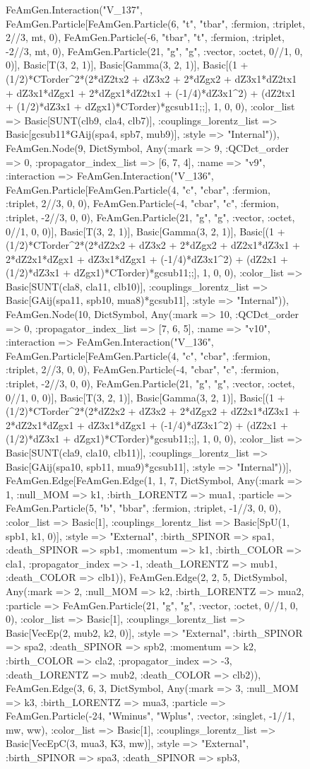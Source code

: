 \documentclass{revtex4}
\begin{document}
\begin{figure}[!htb]
\begin{center}
{FeAmGen.Interaction("V_137", FeAmGen.Particle[FeAmGen.Particle(6, "t", "tbar", :fermion, :triplet, 2//3, mt, 0), FeAmGen.Particle(-6, "tbar", "t", :fermion, :triplet, -2//3, mt, 0), FeAmGen.Particle(21, "g", "g", :vector, :octet, 0//1, 0, 0)], Basic[T(3, 2, 1)], Basic[Gamma(3, 2, 1)], Basic[(1 + (1/2)*CTorder^2*(2*dZ2tx2 + dZ3x2 + 2*dZgx2 + dZ3x1*dZ2tx1 + dZ3x1*dZgx1 + 2*dZgx1*dZ2tx1 + (-1/4)*dZ3x1^2) + (dZ2tx1 + (1/2)*dZ3x1 + dZgx1)*CTorder)*gcsub11;;], 1, 0, 0), :color_list => Basic[SUNT(clb9, cla4, clb7)], :couplings_lorentz_list => Basic[gcsub11*GAij(spa4, spb7, mub9)], :style => "Internal")), FeAmGen.Node(9, Dict{Symbol, Any}(:mark => 9, :QCDct_order => 0, :propagator_index_list => [6, 7, 4], :name => "v9", :interaction => FeAmGen.Interaction("V_136", FeAmGen.Particle[FeAmGen.Particle(4, "c", "cbar", :fermion, :triplet, 2//3, 0, 0), FeAmGen.Particle(-4, "cbar", "c", :fermion, :triplet, -2//3, 0, 0), FeAmGen.Particle(21, "g", "g", :vector, :octet, 0//1, 0, 0)], Basic[T(3, 2, 1)], Basic[Gamma(3, 2, 1)], Basic[(1 + (1/2)*CTorder^2*(2*dZ2x2 + dZ3x2 + 2*dZgx2 + dZ2x1*dZ3x1 + 2*dZ2x1*dZgx1 + dZ3x1*dZgx1 + (-1/4)*dZ3x1^2) + (dZ2x1 + (1/2)*dZ3x1 + dZgx1)*CTorder)*gcsub11;;], 1, 0, 0), :color_list => Basic[SUNT(cla8, cla11, clb10)], :couplings_lorentz_list => Basic[GAij(spa11, spb10, mua8)*gcsub11], :style => "Internal")), FeAmGen.Node(10, Dict{Symbol, Any}(:mark => 10, :QCDct_order => 0, :propagator_index_list => [7, 6, 5], :name => "v10", :interaction => FeAmGen.Interaction("V_136", FeAmGen.Particle[FeAmGen.Particle(4, "c", "cbar", :fermion, :triplet, 2//3, 0, 0), FeAmGen.Particle(-4, "cbar", "c", :fermion, :triplet, -2//3, 0, 0), FeAmGen.Particle(21, "g", "g", :vector, :octet, 0//1, 0, 0)], Basic[T(3, 2, 1)], Basic[Gamma(3, 2, 1)], Basic[(1 + (1/2)*CTorder^2*(2*dZ2x2 + dZ3x2 + 2*dZgx2 + dZ2x1*dZ3x1 + 2*dZ2x1*dZgx1 + dZ3x1*dZgx1 + (-1/4)*dZ3x1^2) + (dZ2x1 + (1/2)*dZ3x1 + dZgx1)*CTorder)*gcsub11;;], 1, 0, 0), :color_list => Basic[SUNT(cla9, cla10, clb11)], :couplings_lorentz_list => Basic[GAij(spa10, spb11, mua9)*gcsub11], :style => "Internal"))], FeAmGen.Edge[FeAmGen.Edge(1, 1, 7, Dict{Symbol, Any}(:mark => 1, :null_MOM => k1, :birth_LORENTZ => mua1, :particle => FeAmGen.Particle(5, "b", "bbar", :fermion, :triplet, -1//3, 0, 0), :color_list => Basic[1], :couplings_lorentz_list => Basic[SpU(1, spb1, k1, 0)], :style => "External", :birth_SPINOR => spa1, :death_SPINOR => spb1, :momentum => k1, :birth_COLOR => cla1, :propagator_index => -1, :death_LORENTZ => mub1, :death_COLOR => clb1)), FeAmGen.Edge(2, 2, 5, Dict{Symbol, Any}(:mark => 2, :null_MOM => k2, :birth_LORENTZ => mua2, :particle => FeAmGen.Particle(21, "g", "g", :vector, :octet, 0//1, 0, 0), :color_list => Basic[1], :couplings_lorentz_list => Basic[VecEp(2, mub2, k2, 0)], :style => "External", :birth_SPINOR => spa2, :death_SPINOR => spb2, :momentum => k2, :birth_COLOR => cla2, :propagator_index => -3, :death_LORENTZ => mub2, :death_COLOR => clb2)), FeAmGen.Edge(3, 6, 3, Dict{Symbol, Any}(:mark => 3, :null_MOM => k3, :birth_LORENTZ => mua3, :particle => FeAmGen.Particle(-24, "Wminus", "Wplus", :vector, :singlet, -1//1, mw, ww), :color_list => Basic[1], :couplings_lorentz_list => Basic[VecEpC(3, mua3, K3, mw)], :style => "External", :birth_SPINOR => spa3, :death_SPINOR => spb3, }
\end{center}
\end{figure}
\end{document}
